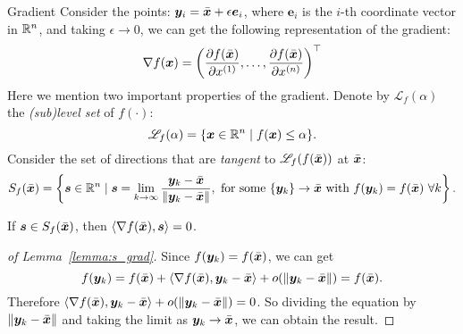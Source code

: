 \begin{note}{Gradient}
    Consider the points: \(\bm{y}_i = \bar{\bm{x}} + \epsilon \bm{e}_i\), where \(\bm{e}_i\) is the \(i\)-th coordinate vector in \(\mathbb{R}^n\), and taking \(\epsilon \to 0\), we can get the following representation of the gradient:
    \begin{equation}\label{eq:grad}
        \nabla f(\bm{x}) = \left( \pdv{f(\bar{\bm{x}})}{x^{(1)}}, \dots, \pdv{f(\bar{\bm{x}})}{x^{(n)}} \right)^\top
    \end{equation}
    Here we mention two important properties of the gradient. Denote by \(\mathscr{L}_f(\alpha)\) the \emph{(sub)level set} of \(f(\cdot)\):
    \[
        \mathscr{L}_f(\alpha) = \{ \bm{x} \in \mathbb{R}^n \mid f(\bm{x}) \le \alpha \}.
    \] 
    Consider the set of directions that are \emph{tangent} to \(\mathscr{L}_f(f(\bar{\bm{x}}))\) at \(\bar{\bm{x}}\):
    \[
        S_f(\bar{\bm{x}}) = \left\{
            \bm{s} \in \mathbb{R}^n \mid \bm{s} = \lim_{k \to \infty} \frac{\bm{y}_k - \bar{\bm{x}}}{\norm{\bm{y}_k - \bar{\bm{x}}}},
            ~\text{for some}~\{\bm{y}_k\} \to \bar{\bm{x}} ~\text{with}~ f(\bm{y}_k) = f(\bar{\bm{x}}) ~ \forall k
        \right\}.
    \]

    \begin{lemma}\label{lemma:s_grad}
        If \(\bm{s} \in S_f(\bar{\bm{x}})\), then \(\left\langle \nabla f(\bar{\bm{x}}), \bm{s} \right\rangle = 0\).
    \end{lemma}
    
    \begin{proof}[of Lemma~\ref{lemma:s_grad}]
        Since \(f(\bm{y}_k) = f(\bar{\bm{x}})\), we can get
        \[
            f(\bm{y}_k) = f(\bar{\bm{x}}) + \left\langle \nabla f(\bar{\bm{x}}), \bm{y}_k - \bar{\bm{x}} \right\rangle + o(\norm{\bm{y}_k - \bar{\bm{x}}}) = f(\bar{\bm{x}}).
        \]
        Therefore \(\left\langle \nabla f(\bar{\bm{x}}), \bm{y}_k - \bar{\bm{x}} \right\rangle + o(\norm{\bm{y}_k - \bar{\bm{x}}}) = 0\). So dividing the equation by \(\norm{\bm{y}_k - \bar{\bm{x}}}\) and
        taking the limit as \(\bm{y}_k \to \bar{\bm{x}}\), we can obtain the result.
    \end{proof}


\end{note}

